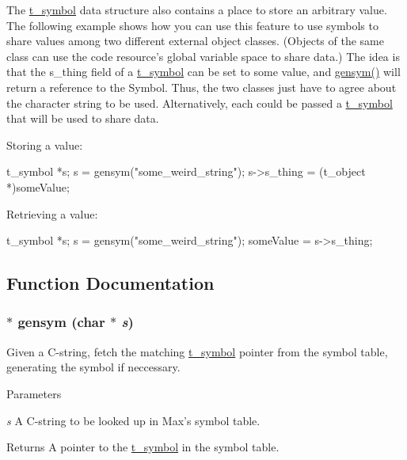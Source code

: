 The \hyperlink{structt__symbol}{t\_\-symbol} data structure also contains a place to store an arbitrary value. The following example shows how you can use this feature to use symbols to share values among two different external object classes. (Objects of the same class can use the code resource’s global variable space to share data.) The idea is that the s\_\-thing field of a \hyperlink{structt__symbol}{t\_\-symbol} can be set to some value, and \hyperlink{group__symbol_ga8268797d125a15bae1010af70b559e05}{gensym()} will return a reference to the Symbol. Thus, the two classes just have to agree about the character string to be used. Alternatively, each could be passed a \hyperlink{structt__symbol}{t\_\-symbol} that will be used to share data.

Storing a value:


\begin{DoxyCode}
    t_symbol *s; 
    s = gensym("some_weird_string"); 
    s->s_thing = (t_object *)someValue; 
\end{DoxyCode}


Retrieving a value:


\begin{DoxyCode}
    t_symbol *s; 
    s = gensym("some_weird_string"); 
    someValue = s->s_thing; 
\end{DoxyCode}
 

\subsection{Function Documentation}
\hypertarget{group__symbol_ga8268797d125a15bae1010af70b559e05}{
\subsubsection[{gensym}]{$\ast$ gensym (char $\ast$ {\em s})}}
\label{group__symbol_ga8268797d125a15bae1010af70b559e05}


Given a C-\/string, fetch the matching \hyperlink{structt__symbol}{t\_\-symbol} pointer from the symbol table, generating the symbol if neccessary. 
\begin{DoxyParams}{Parameters}
\item[{\em s}]A C-\/string to be looked up in Max’s symbol table. \end{DoxyParams}
\begin{DoxyReturn}{Returns}
A pointer to the \hyperlink{structt__symbol}{t\_\-symbol} in the symbol table. 
\end{DoxyReturn}
